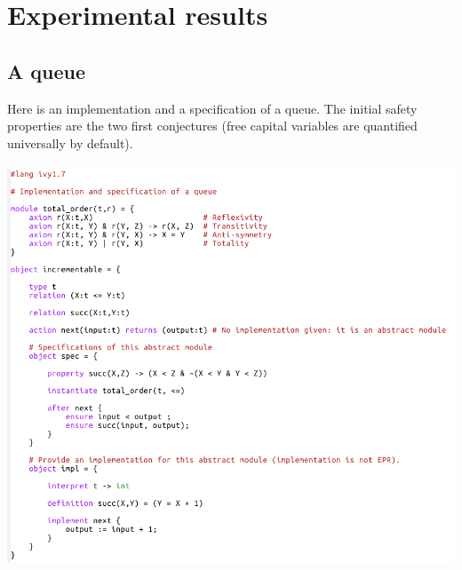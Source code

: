 \documentclass[11pt,a4paper,oldfontcommands,openany]{memoir}
\begin{document}



\appendix 
\chapter{Experimental results}

    \section{A queue}

    Here is an implementation and a specification of a queue.
    The initial safety properties are the two first conjectures (free capital variables are quantified universally by default).\\\\
    \includegraphics[width=17cm]{Queue1}\\
\end{document}
